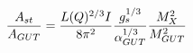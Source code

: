 \begin{equation}\label{polydon}
{A_{st}\over A_{GUT}}={L(Q)^{2/3}I\over 8\pi^2} {g_{s}^{1/3}\over
\alpha_{GUT}^{1/3}} {M_X^2\over M_{GUT}^2}
\end{equation}

